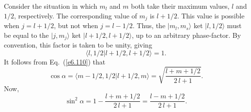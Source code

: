 Consider the situation in which $m_l$ and $m$ both take their maximum values,
$l$ and $1/2$, respectively. The corresponding value of $m_j$ is
$l+1/2$. This value is possible when  $j=l+1/2$, but not when $j=l-1/2$. 
Thus, the $|m_l, m_s\rangle$ ket $|l,1/2\rangle$ must be equal to
the $|j,m_j\rangle$ ket $|l+1/2, l+1/2\rangle$, up to an arbitrary phase-factor.
By convention, this factor is taken to be unity, giving
\begin{equation}
\langle l, 1/2|l+1/2, l+1/2\rangle = 1.
\end{equation}
It follows from Eq.~(\ref{e6.110}) that
\begin{equation}
\cos\alpha=\langle m-1/2, 1/2|l+1/2, m\rangle = \sqrt{\frac{l+m+1/2}{2\,l+1}}.
\end{equation}
Now,
\begin{equation}
\sin^2\alpha = 1 - \frac{l+m+1/2}{2\,l+1} = \frac{l-m+1/2}{2\,l+1}.
\end{equation}

